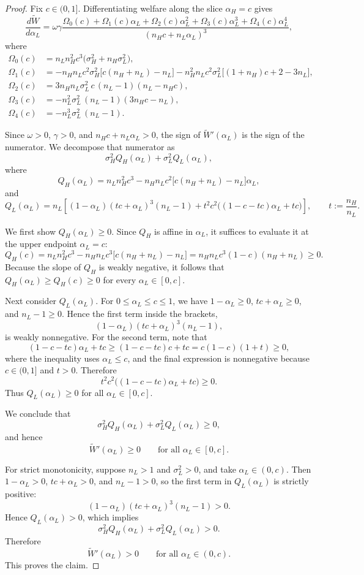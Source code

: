 \documentclass[a4paper,12pt]{article}
\theoremstyle{definition}
\theoremstyle{remark}
\newcommand{\1}{\mathbf{1}}
\begin{document}
\begin{proof}
Fix \(c\in(0,1]\). Differentiating welfare along the slice \(\alpha_H=c\) gives
\[
\frac{d\widetilde W}{d\alpha_L}
= \omega \gamma
   \frac{\Omega_0(c) + \Omega_1(c)\alpha_L + \Omega_2(c)\alpha_L^2
        + \Omega_3(c)\alpha_L^3 + \Omega_4(c)\alpha_L^4}
        {(n_H c + n_L \alpha_L)^3},
\]
where
\[
\begin{aligned}
\Omega_0(c) &= n_L n_H^2 c^3\big(\sigma_H^2 + n_H \sigma_L^2\big),\\
\Omega_1(c) &= - n_H n_L c^2 \sigma_H^2\big[c(n_H + n_L) - n_L\big]
              - n_H^2 n_L c^2 \sigma_L^2\big[(1+n_H)c + 2 - 3 n_L\big],\\
\Omega_2(c) &= 3 n_H n_L \sigma_L^2\, c\, (n_L - 1)(n_L - n_H c),\\
\Omega_3(c) &= - n_L^2 \sigma_L^2\, (n_L - 1)(3 n_H c - n_L),\\
\Omega_4(c) &= - n_L^3 \sigma_L^2\, (n_L - 1).
\end{aligned}
\]

Since \(\omega>0\), \(\gamma>0\), and \(n_H c+n_L\alpha_L>0\), the sign of
\(\widetilde W'(\alpha_L)\) is the sign of the numerator. We decompose that
numerator as
\[
\sigma_H^2 Q_H(\alpha_L)+\sigma_L^2 Q_L(\alpha_L),
\]
where
\[
Q_H(\alpha_L)
=
n_L n_H^2 c^3
-
n_H n_L c^2\bigl[c(n_H+n_L)-n_L\bigr]\alpha_L,
\]
and
\[
Q_L(\alpha_L)
=
n_L\!\left[
(1-\alpha_L)(t c+\alpha_L)^3(n_L-1)
+t^2 c^2\bigl((1-c-t c)\alpha_L+t c\bigr)
\right],
\qquad t:=\frac{n_H}{n_L}.
\]

We first show \(Q_H(\alpha_L)\ge 0\). Since \(Q_H\) is affine in \(\alpha_L\),
it suffices to evaluate it at the upper endpoint \(\alpha_L=c\):
\[
Q_H(c)
=
n_L n_H^2 c^3
-
n_H n_L c^3\bigl[c(n_H+n_L)-n_L\bigr]
=
n_H n_L c^3(1-c)(n_H+n_L)
\ge 0.
\]
Because the slope of \(Q_H\) is weakly negative, it follows that
\(Q_H(\alpha_L)\ge Q_H(c)\ge 0\) for every \(\alpha_L\in[0,c]\).

Next consider \(Q_L(\alpha_L)\). For \(0\le \alpha_L\le c\le 1\), we have
\(1-\alpha_L\ge 0\), \(t c+\alpha_L\ge 0\), and \(n_L-1\ge 0\). Hence the first
term inside the brackets,
\[
(1-\alpha_L)(t c+\alpha_L)^3(n_L-1),
\]
is weakly nonnegative. For the second term, note that
\[
(1-c-t c)\alpha_L+t c
\ge
(1-c-t c)c+t c
=
c(1-c)(1+t)
\ge 0,
\]
where the inequality uses \(\alpha_L\le c\), and the final expression is
nonnegative because \(c\in(0,1]\) and \(t>0\). Therefore
\[
t^2 c^2\bigl((1-c-t c)\alpha_L+t c\bigr)\ge 0.
\]
Thus \(Q_L(\alpha_L)\ge 0\) for all \(\alpha_L\in[0,c]\).

We conclude that
\[
\sigma_H^2 Q_H(\alpha_L)+\sigma_L^2 Q_L(\alpha_L)\ge 0,
\]
and hence
\[
\widetilde W'(\alpha_L)\ge 0
\qquad\text{for all }\alpha_L\in[0,c].
\]

For strict monotonicity, suppose \(n_L>1\) and \(\sigma_L^2>0\), and take
\(\alpha_L\in(0,c)\). Then \(1-\alpha_L>0\), \(t c+\alpha_L>0\), and
\(n_L-1>0\), so the first term in \(Q_L(\alpha_L)\) is strictly positive:
\[
(1-\alpha_L)(t c+\alpha_L)^3(n_L-1)>0.
\]
Hence \(Q_L(\alpha_L)>0\), which implies
\[
\sigma_H^2 Q_H(\alpha_L)+\sigma_L^2 Q_L(\alpha_L)>0.
\]
Therefore
\[
\widetilde W'(\alpha_L)>0
\qquad\text{for all }\alpha_L\in(0,c).
\]
This proves the claim.
\end{proof}
\end{document}
